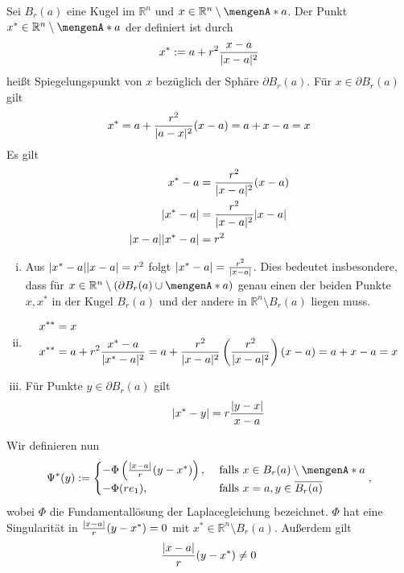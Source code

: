 
\begin{definition}
	Sei $B_r(a)$ eine Kugel im $\mathbb{R}^n$ und $x \in \mathbb{R}^n \setminus \set{a}$. Der Punkt $x^* \in \mathbb{R}^n \setminus \set{a}$ der definiert ist durch
	\[
		x^* := a + r^2 \frac{x-a}{\lvert x-a\rvert^2}
	\]
	heißt Spiegelungspunkt von $x$ bezüglich der Sphäre $ \partial B_r(a)$.
	Für $x \in \partial B_r(a)$ gilt
	\[
		x^* = a + \frac{r^2}{\lvert a-x\rvert^2}(x-a) = a + x -a = x
	\]
	Es gilt
	\begin{align*}
		x^*-a &= \frac{r^2}{\lvert x-a\rvert^2}(x-a) \\
		\lvert x^*-a\rvert &= \frac{r^2}{\lvert x-a\rvert^2}\lvert x-a\rvert \\
		\lvert x-a\rvert\lvert x^*-a\rvert &= r^2
	\end{align*}
\end{definition}
\begin{bemerkung}
	\begin{enumerate}[(i)]
		\item Aus $\lvert x^*-a\rvert \lvert x-a\rvert = r^2$ folgt $\lvert x^* -a \rvert = \frac{r^2}{\lvert x-a\rvert}$. 
		Dies bedeutet insbesondere, dass für $x \in  \mathbb{R}^n \setminus \left( \partial B_r(a) \cup \set{a} \right)$ genau einen der beiden Punkte $x,x^*$ 
		in der Kugel $B_r(a)$ und der andere in $\mathbb{R}^n \setminus B_r(a)$ liegen muss.
		\item \begin{align*}
			x^{**} &= x \\
			x^{**} &= a + r^2 \frac{x^* - a}{\lvert x^*-a\rvert^2} = a + \frac{r^2}{\lvert x-a\rvert^2}\left( \frac{r^2}{\lvert x-a\rvert^2} \right)(x-a) = a + x-a =x
		\end{align*}
		\item Für Punkte $y \in \partial B_r(a)$ gilt
		\[
			\lvert x^*-y\rvert = r \frac{\lvert y-x\rvert}{x-a}
		\]
	\end{enumerate}
\end{bemerkung}
Wir definieren nun 
\[
	\Psi^*(y):= \begin{cases}
		- \Phi \left( \frac{\abs{x-a}}{r}(y-x^*) \right), &\text{ falls } x \in B_r(a) \setminus \set{a} \\
		- \Phi (r e_1) , &\text{ falls } x = a, y \in \overline{B_r(a)}
	\end{cases},
\]
wobei $\Phi$ die Fundamentallösung der Laplacegleichung bezeichnet. 
$\Phi$ hat eine Singularität in $ \frac{\lvert x-a\rvert}{r} (y - x^*)= 0$ mit $x^* \in \mathbb{R}^n \setminus B_r(a)$. Außerdem gilt
\[
	\frac{\lvert x-a\rvert}{r}(y- x^*) \neq 0
\]
